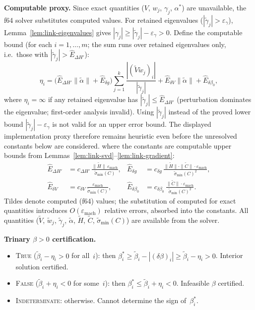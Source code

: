 \begin{remark}
\textbf{Computable proxy.}
Since exact quantities ($V$, $w_j$, $\gamma_j$, $\alpha^*$)
are unavailable, the f64 solver substitutes computed values.
For retained eigenvalues ($|\tilde\gamma_j| > \varepsilon_\gamma$),
Lemma~\ref{lem:link-eigenvalues} gives
$|\gamma_j| \geq |\tilde\gamma_j| - \varepsilon_\gamma > 0$.
Define the computable bound (for each $i = 1, \ldots, m$;
the sum runs over retained eigenvalues only,
i.e.\ those with $|\tilde\gamma_j| > \hat E_{\Delta H'}$):
\begin{equation}\label{eq:eta-computable}
  \eta_i
  = \bigl(\hat E_{\Delta H'} \|\tilde\alpha\|
    + \hat E_{\delta g}\bigr)
    \sum_{j=1}^{k}
      \frac{|(\tilde V \tilde w_j)_i|}
           {|\tilde\gamma_j|}
  + \hat E_{\delta V} \|\tilde\alpha\|
  + \hat E_{\delta\beta_0},
\end{equation}
where $\eta_i = \infty$ if any retained eigenvalue has
$|\tilde\gamma_j| \leq \hat E_{\Delta H'}$ (perturbation
dominates the eigenvalue; first-order analysis invalid).
Using $|\tilde\gamma_j|$ instead of the proved lower bound
$|\tilde\gamma_j|-\varepsilon_\gamma$ is not valid for an upper error bound.
The displayed implementation proxy therefore remains heuristic even before
the unresolved constants below are considered.
where the constants are computable upper bounds from
Lemmas~\ref{lem:link-svd}--\ref{lem:link-gradient}:
\begin{align*}
  \hat E_{\Delta H'}
  &= c_{\Delta H'}\,
     \frac{\|\tilde H\|\, \varepsilon_{\mathrm{mach}}}
          {\tilde\sigma_{\min}(C)},
  &
  \hat E_{\delta g}
  &= c_{\delta g}\,
     \frac{\|\tilde H\| \cdot \|\tilde C\| \cdot
           \varepsilon_{\mathrm{mach}}}
          {\tilde\sigma_{\min}(C)^2}, \\
  \hat E_{\delta V}
  &= c_{\delta V}\,
     \frac{\varepsilon_{\mathrm{mach}}}
          {\tilde\sigma_{\min}(C)},
  &
  \hat E_{\delta\beta_0}
  &= c_{\delta\beta_0}\,
     \frac{\|\tilde C\| \cdot
           \varepsilon_{\mathrm{mach}}}
          {\tilde\sigma_{\min}(C)^2}.
\end{align*}
Tildes denote computed (f64) values; the substitution
of computed for exact quantities introduces $O(\varepsilon_{\mathrm{mach}})$
relative errors, absorbed into the constants.
All quantities ($\tilde V$, $\tilde w_j$, $\tilde\gamma_j$,
$\tilde\alpha$, $\tilde H$, $\tilde C$,
$\tilde\sigma_{\min}(C)$) are available from the solver.

\medskip\noindent
\textbf{Trinary $\beta > 0$ certification.}
\begin{itemize}
  \item \textsc{True}
    ($\tilde\beta_i - \eta_i > 0$ for all~$i$):
    then $\beta^*_i \geq \tilde\beta_i - |(\delta\beta)_i|
    \geq \tilde\beta_i - \eta_i > 0$.
    Interior solution certified.
  \item \textsc{False}
    ($\tilde\beta_i + \eta_i < 0$ for some~$i$):
    then $\beta^*_i \leq \tilde\beta_i + \eta_i < 0$.
    Infeasible $\beta$ certified.
  \item \textsc{Indeterminate}: otherwise.
    Cannot determine the sign of~$\beta^*_i$.
\end{itemize}


\end{remark}
